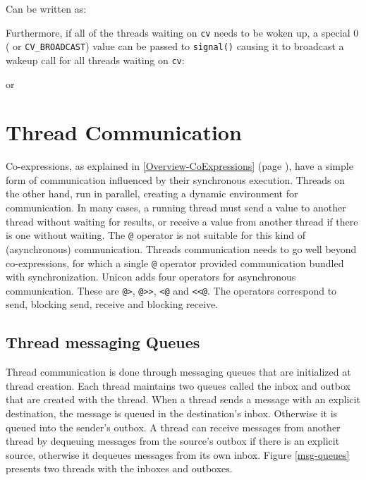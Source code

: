 
\noindent
Can be written as:


\noindent
Furthermore, if all of the threads waiting on \texttt{cv} needs to be woken
up, a special 0 ( or \texttt{CV\_BROADCAST}) value can be passed to
\texttt{signal()} causing it to broadcast a wakeup call for all threads
waiting on \texttt{cv}:

\noindent or

\section{Thread Communication}
Co-expressions, as explained in \ref{Overview-CoExpressions}
(page \pageref{Overview-CoExpressions}), have a simple form
of communication influenced by their synchronous execution. Threads on the
other hand, run in parallel, creating a dynamic environment for
communication. In many cases, a running thread must send a value to another
thread without waiting for results, or receive a value from another thread
if there is one without waiting. The \texttt{@} operator is not suitable
for this kind of (asynchronous) communication. Threads communication needs
to go well beyond co-expressions, for which a single \texttt{@} operator
provided communication bundled with synchronization. Unicon adds four
operators for asynchronous communication. These are \texttt{@>},
\texttt{@>{}>}, \texttt{<@} and \texttt{<{}<@}. The operators correspond to
send, blocking send, receive and blocking receive.

\subsection{Thread messaging Queues}
Thread communication is done through messaging queues that are initialized at thread
creation. Each thread maintains two queues called the inbox and outbox that are created
with the thread. When a thread sends a message with an explicit destination, the message
is queued in the destination's inbox. Otherwise it is queued into the sender's outbox.
A thread can receive messages from another thread by dequeuing messages from the source's
outbox if there is an explicit source, otherwise it dequeues messages from its own inbox.
Figure \ref{msg-queues} presents two threads with the inboxes and outboxes.


